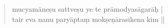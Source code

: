 \documentclass[12pt]{article}
\begin{document}

\begin{quote}
	mucyamāneṣu sattveṣu ye te prāmodyasāgarāḥ | \\
	tair eva nanu paryāptaṃ mokṣeṇārasikena kim ||

% 
% 
\end{quote}
\end{document}
